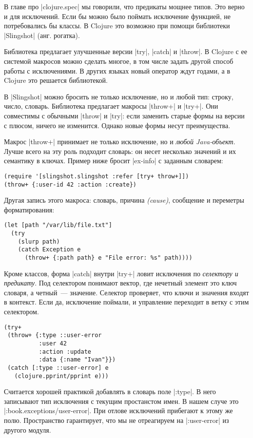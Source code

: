 В главе про \spverb|clojure.spec| мы говорили, что предикаты мощнее типов. Это
верно и для исключений. Если бы можно было поймать исключение функцией, не
потребовались бы классы. В Clojure это возможно при помощи библиотеки
\spverb|Slingshot| (анг. рогатка).

Библиотека предлагает улучшенные версии \spverb|try|, \spverb|catch| и
\spverb|throw|. В Clojure с ее системой макросов можно сделать многое, в том
числе задать другой способ работы с исключениями. В других языках новый оператор
ждут годами, а в Clojure это решается библиотекой.

В \spverb|Slingshot| можно бросить не только исключение, но и любой тип: строку,
число, словарь. Библиотека предлагает макросы \spverb|throw+| и
\spverb|try+|. Они совместимы с обычными \spverb|throw| и \spverb|try|: если
заменить старые формы на версии с плюсом, ничего не изменится. Однако новые
формы несут преимущества.

Макрос \spverb|throw+| принимает не только исключение, но и \emph{любой
  Java-объект}. Лучше всего на эту роль подходит словарь: он несет несколько
значений и их семантику в ключах. Пример ниже бросит \spverb|ex-info| с заданным
словарем:

\begin{verbatim}
(require '[slingshot.slingshot :refer [try+ throw+]])
(throw+ {:user-id 42 :action :create})
\end{verbatim}

Другая запись этого макроса: словарь, причина \emph{(cause)}, сообщение и
переметры форматирования:

\begin{verbatim}
(let [path "/var/lib/file.txt"]
  (try
    (slurp path)
    (catch Exception e
      (throw+ {:path path} e "File error: %s" path))))
\end{verbatim}

Кроме классов, форма \spverb|catch| внутри \spverb|try+| ловит исключения по
\emph{селектору и предикату}. Под селектором понимают вектор, где нечетный
элемент это ключ словаря, а четный~--- значение. Селектор проверяет, что ключи и
значения входят в контекст. Если да, исключение поймали, и управление переходит
в ветку с этим селектором.

\begin{verbatim}
(try+
 (throw+ {:type ::user-error
          :user 42
          :action :update
          :data {:name "Ivan"}})
 (catch [:type ::user-error] e
   (clojure.pprint/pprint e)))
\end{verbatim}
Считается хорошей практикой добавлять в словарь поле \spverb|:type|. В него записывают
тип исключения с текущим простанстом имен. В нашем случе это
\spverb|:book.exceptions/user-error|. При отлове исключений прибегают к этому же
полю. Пространство гарантирует, что мы не отреагируем на \spverb|:user-error| из
другого модуля.

